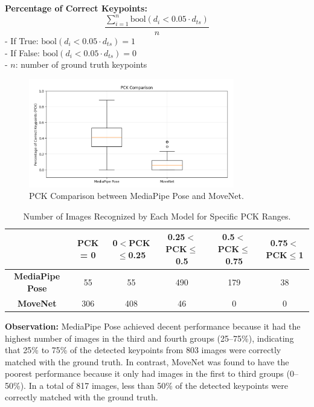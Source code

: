 \documentclass[12pt]{article}
\begin{document}
\textbf{Percentage of Correct Keypoints:}
\[
    \frac{\sum_{i=1}^{n} \mathrm{bool}(d_i < 0.05 \cdot d_{ts})}{n}
\]
- If True: \(\text{bool}(d_i < 0.05 \cdot d_{ts}) = 1\)\\
- If False: \(\text{bool}(d_i < 0.05 \cdot d_{ts}) = 0\)\\
- \(n\): number of ground truth keypoints
\begin{figure}[ht]
    \centering
    \includegraphics[width=0.8\textwidth]{pck.png}
    \caption{PCK Comparison between MediaPipe Pose and MoveNet.}
\end{figure}
\begin{table}[h]
    \centering
    \caption{Number of Images Recognized by Each Model for Specific PCK Ranges.}
    \begin{adjustbox}{width=\textwidth}
    \begin{tabular}{|c|c|c|c|c|c|}
        \hline
        & \textbf{PCK = 0} & \textbf{0$<$PCK$\le$0.25} & \textbf{0.25$<$PCK$\le$0.5} & \textbf{0.5$<$PCK$\le$0.75} & \textbf{0.75$<$PCK$\le$1} \\
        \hline
        \textbf{MediaPipe Pose} & 55 & 55 & 490 & 179 & 38 \\
        \hline
        \textbf{MoveNet} & 306 & 408 & 46 & 0 & 0 \\
        \hline
    \end{tabular}
    \end{adjustbox}
\end{table}
    
\textbf{Observation:} MediaPipe Pose achieved decent performance because it had the highest number of images in the third and fourth groups (25–75\%), indicating that 25\% to 75\% of the detected keypoints from 803 images were correctly matched with the ground truth. In contrast, MoveNet was found to have the poorest performance because it only had images in the first to third groups (0–50\%). In a total of 817 images, less than 50\% of the detected keypoints were correctly matched with the ground truth.
\end{document}
